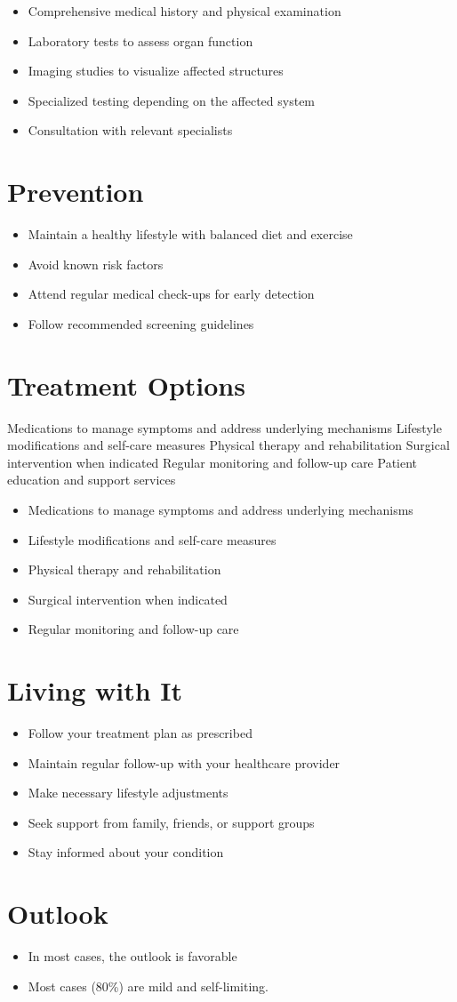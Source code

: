\begin{itemize}[noitemsep]
  \item Comprehensive medical history and physical examination
  \item Laboratory tests to assess organ function
  \item Imaging studies to visualize affected structures
  \item Specialized testing depending on the affected system
  \item Consultation with relevant specialists
\end{itemize}
\section{Prevention}
\begin{itemize}[noitemsep]
  \item Maintain a healthy lifestyle with balanced diet and exercise
  \item Avoid known risk factors
  \item Attend regular medical check-ups for early detection
  \item Follow recommended screening guidelines
\end{itemize}
\section{Treatment Options}
Medications to manage symptoms and address underlying mechanisms Lifestyle modifications and self-care measures Physical therapy and rehabilitation Surgical intervention when indicated Regular monitoring and follow-up care Patient education and support services

\begin{itemize}[noitemsep]
  \item Medications to manage symptoms and address underlying mechanisms
  \item Lifestyle modifications and self-care measures
  \item Physical therapy and rehabilitation
  \item Surgical intervention when indicated
  \item Regular monitoring and follow-up care
\end{itemize}
\section{Living with It}
\begin{itemize}[noitemsep]
  \item Follow your treatment plan as prescribed
  \item Maintain regular follow-up with your healthcare provider
  \item Make necessary lifestyle adjustments
  \item Seek support from family, friends, or support groups
  \item Stay informed about your condition
\end{itemize}
\section{Outlook}
\begin{itemize}[noitemsep]
  \item In most cases, the outlook is favorable
  \item Most cases (80\%) are mild and self-limiting.
\end{itemize}

